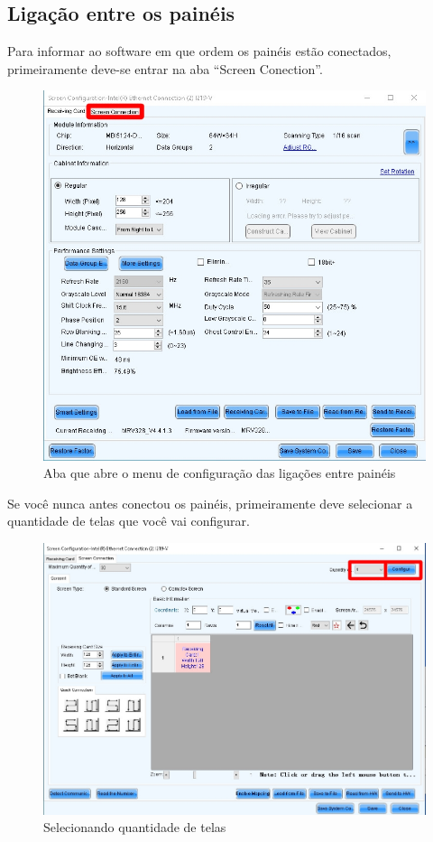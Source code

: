 \documentclass[12pt, a4paper]{article}
\begin{document}
\subsection{Ligação entre os painéis}\label{Ligação entre os painéis}
Para informar ao software em que ordem os painéis estão conectados, primeiramente deve-se entrar na aba ``Screen Conection''.
\begin{figure}[!htb]
	\centering
	\includegraphics[width=\textwidth]{ScreenConection.jpeg}
	\caption{\label{fig:ScreenConection.jpeg}Aba que abre o menu de configuração das ligações entre painéis}
\end{figure}

\newpage
Se você nunca antes conectou os painéis, primeiramente deve selecionar a quantidade de telas que você vai configurar.

\begin{figure}[!htb]
	\centering
	\includegraphics[width=\textwidth]{ligando_paineis.jpeg}
	\caption{\label{fig:ligando_paineis.jpeg}Selecionando quantidade de telas}
\end{figure}
\end{document}
